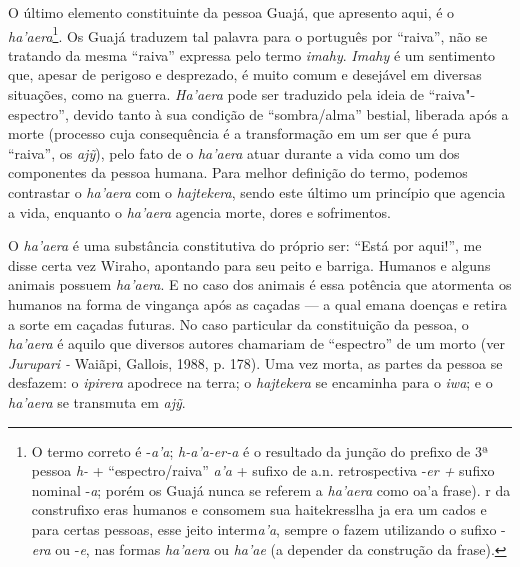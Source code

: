 O último elemento constituinte da pessoa Guajá, que apresento aqui, é o
\emph{ha'aera}\footnote{O termo correto é -\emph{a'a}; \emph{h-a'a-er-a}
  é o resultado da junção do prefixo de 3ª pessoa \emph{h-} +
  ``espectro/raiva'' \emph{a'a} + sufixo de a.n. retrospectiva -\emph{er
  +} sufixo nominal -\emph{a}; porém os Guajá nunca se referem a
  \emph{ha'aera} como oa'a frase). r da construfixo eras humanos e
  consomem sua haitekresslha ja era um cados e para certas pessoas, esse
  jeito interm\emph{a'a}, sempre o fazem utilizando o sufixo -\emph{era}
  ou -\emph{e}, nas formas \emph{ha'aera} ou \emph{ha'ae} (a depender da
  construção da frase).}. Os Guajá traduzem tal palavra para o português
por ``raiva'', não se tratando da mesma ``raiva'' expressa pelo termo
\emph{imahy}. \emph{Imahy} é um sentimento que, apesar de perigoso e
desprezado, é muito comum e desejável em diversas situações, como na
guerra. \emph{Ha'aera} pode ser traduzido pela ideia de
``raiva"-espectro'', devido tanto à sua condição de ``sombra/alma'' bestial,
liberada após a morte (processo cuja consequência é a transformação em
um ser que é pura ``raiva'', os \emph{ajỹ}), pelo fato de o \emph{ha'aera}
atuar durante a vida como um dos componentes da pessoa humana. Para
melhor definição do termo, podemos contrastar o \emph{ha'aera} com o
\emph{hajtekera}, sendo este último um princípio que agencia a vida,
enquanto o \emph{ha'aera} agencia morte, dores e sofrimentos.

O \emph{ha'aera} é uma substância constitutiva do próprio ser: ``Está por
aqui!'', me disse certa vez Wiraho, apontando para seu peito e barriga.
Humanos e alguns animais possuem \emph{ha'aera}. E no caso dos animais é
essa potência que atormenta os humanos na forma de vingança após as
caçadas --- a qual emana doenças e retira a sorte em caçadas futuras. No
caso particular da constituição da pessoa, o \emph{ha'aera} é aquilo que
diversos autores chamariam de ``espectro'' de um morto (ver \emph{Jurupari
-} Waiãpi, Gallois, 1988, p. 178). Uma vez morta, as partes da pessoa se
desfazem: o \emph{ipirera} apodrece na terra; o \emph{hajtekera} se
encaminha para o \emph{iwa}; e o \emph{ha'aera} se transmuta em
\emph{ajỹ}.

